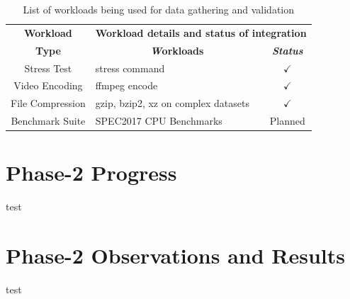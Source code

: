 \documentclass[conference]{IEEEtran}
\begin{document}
        \begin{table}[htbp]
            \caption{List of workloads being used for data gathering and validation}
            \begin{center}
                \begin{tabular}{|c|p{4cm}|c|}
                    \hline
                    \textbf{Workload}&\multicolumn{2}{|c|}{\textbf{Workload details and status  of integration}} \\
                    \cline{2-3} 
                    \textbf{Type} & \multicolumn{1}{|c|}{\textbf{\textit Workloads}} & \textbf{\textit{Status}} \\
                    \hline
                    Stress Test & stress command \cite{linux-stress-testing} & $\checkmark$ \\
                    \hline
                    Video Encoding & ffmpeg encode \cite{linux-stress-testing} & $\checkmark$ \\
                    \hline
                    File Compression & gzip, bzip2, xz on complex datasets \cite{compression-benchmarking} & $\checkmark$ \\
                    \hline
                    Benchmark Suite & SPEC2017 CPU Benchmarks \cite{10.1145/3185768.3185771} & Planned \\
                    \hline
                \end{tabular}
                \label{Workload-listing}
            \end{center}
        \end{table}

\section{Phase-2 Progress}
    \par test

\section{Phase-2 Observations and Results}
    \par test
\end{document}
